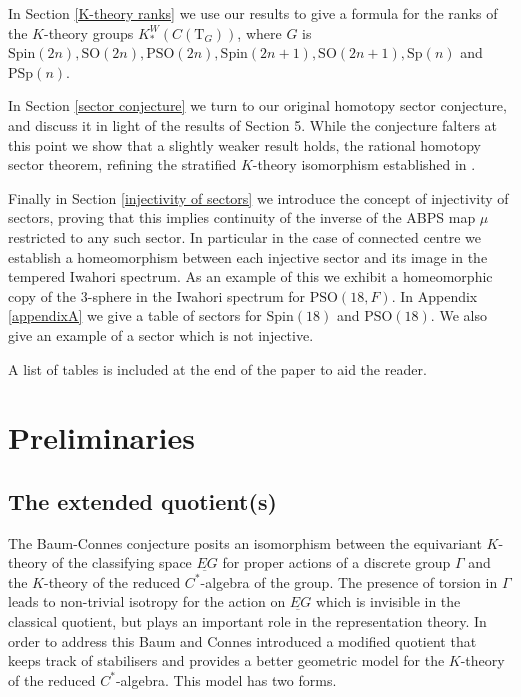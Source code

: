\documentclass[11pt,a4paper]{article}
\def\Spin{\mathrm{Spin}}
\def\SO{\mathrm{SO}}
\def\PSO{\mathrm{PSO}}
\def\Sp{\mathrm{Sp}}
\def\PSp{\mathrm{PSp}}
\def\bT{\mathrm{T}}
\begin{document}
In Section \ref{K-theory ranks} we use our results to give a formula for the ranks of the $K$-theory groups $K_*^W(C(\bT_G))$, where $G$ is $\Spin(2n),\SO(2n),\PSO(2n),\Spin(2n+1),\SO(2n+1),\Sp(n)$ and $\PSp(n)$. 



In Section \ref{sector conjecture} we turn to our original homotopy sector conjecture, and discuss it in light of the results of Section  5. While the conjecture falters at this point we show that a slightly weaker result holds, the rational homotopy sector theorem, refining the stratified $K$-theory isomorphism established in \cite{NPWAn}.

Finally in Section \ref{injectivity of sectors} we introduce the concept of injectivity of sectors, proving that this implies continuity of the inverse of the ABPS map $\mu$ restricted to any such sector. In particular in the case of connected centre we establish a homeomorphism between each injective sector and its image in the tempered Iwahori spectrum. As an example of this we exhibit a homeomorphic copy of the $3$-sphere in the Iwahori spectrum for $\PSO(18,F)$. In Appendix \ref{appendixA} we give a table of sectors for $\Spin(18)$ and $\PSO(18)$. We also give an example of a sector which is not injective.

A list of tables is included at the end of the paper to aid the reader.













\section{Preliminaries}


\subsection{The extended quotient(s)}

The Baum-Connes conjecture posits an isomorphism between the equivariant $K$-theory of the classifying space $\underbar{EG}$ for proper actions of a discrete group $\Gamma$ and the $K$-theory of the reduced $C^*$-algebra of the group.  The presence of torsion in $\Gamma$ leads to non-trivial isotropy for the action on $\underbar{EG}$ which is invisible in the classical quotient, but plays an important role in the representation theory. In order to address this Baum and Connes introduced a modified quotient that keeps track of stabilisers and provides a better geometric model for the $K$-theory of the reduced $C^*$-algebra. This model has two forms.
\end{document}
